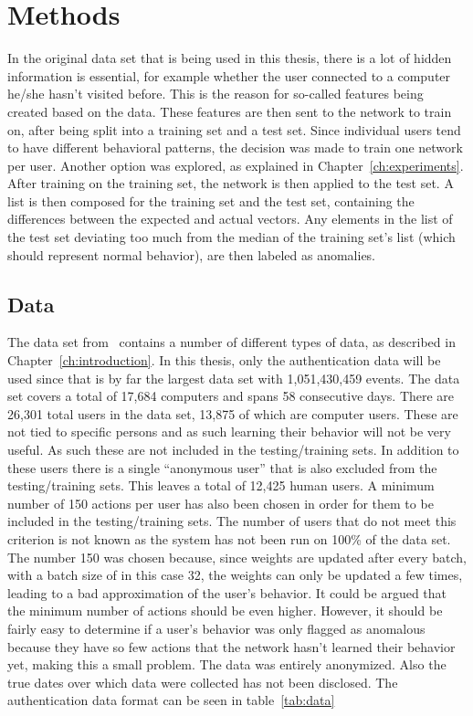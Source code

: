 \chapter{Methods}\label{ch:methods}

In the original data set that is being used in this thesis, there is a lot of hidden information is essential, for example whether the user connected to a computer he/she hasn't visited before. This is the reason for so-called features being created based on the data. These features are then sent to the network to train on, after being split into a training set and a test set. Since individual users tend to have different behavioral patterns, the decision was made to train one network per user. Another option was explored, as explained in Chapter~\ref{ch:experiments}. After training on the training set, the network is then applied to the test set. A list is then composed for the training set and the test set, containing the differences between the expected and actual vectors. Any elements in the list of the test set deviating too much from the median of the training set's list (which should represent normal behavior), are then labeled as anomalies.

\section{Data}
The data set from~\cite{akent-2015-enterprise-data} contains a number of different types of data, as described in Chapter~\ref{ch:introduction}. In this thesis, only the authentication data will be used since that is by far the largest data set with 1,051,430,459 events. The data set covers a total of 17,684 computers and spans 58 consecutive days. There are 26,301 total users in the data set, 13,875 of which are computer users. These are not tied to specific persons and as such learning their behavior will not be very useful. As such these are not included in the testing/training sets. In addition to these users there is a single \enquote{anonymous user} that is also excluded from the testing/training sets. This leaves a total of 12,425 human users. A minimum number of 150 actions per user has also been chosen in order for them to be included in the testing/training sets. The number of users that do not meet this criterion is not known as the system has not been run on 100\% of the data set. The number 150 was chosen because, since weights are updated after every batch, with a batch size of in this case 32, the weights can only be updated a few times, leading to a bad approximation of the user's behavior. It could be argued that the minimum number of actions should be even higher. However, it should be fairly easy to determine if a user's behavior was only flagged as anomalous because they have so few actions that the network hasn't learned their behavior yet, making this a small problem. The data was entirely anonymized. Also the true dates over which data were collected has not been disclosed. The authentication data format can be seen in table~\ref{tab:data}

